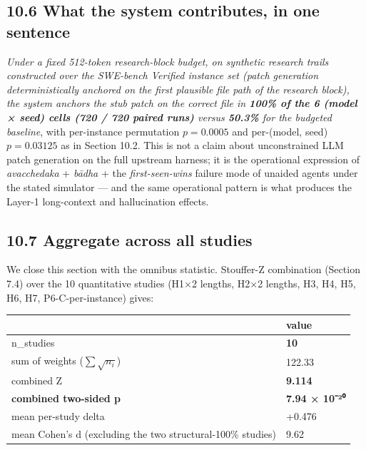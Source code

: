 \subsection{10.6 What the system contributes, in one sentence}\label{what-the-system-contributes-in-one-sentence}

\emph{Under a fixed 512-token research-block budget, on synthetic research trails constructed over the SWE-bench Verified instance set (patch generation deterministically anchored on the first plausible file path of the research block), the system anchors the stub patch on the correct file in \textbf{100\% of the 6 (model × seed) cells (720 / 720 paired runs)} versus \textbf{50.3\%} for the budgeted baseline}, with per-instance permutation \(p = 0.0005\) and per-(model, seed) \(p = 0.03125\) as in Section 10.2. This is not a claim about unconstrained LLM patch generation on the full upstream harness; it is the operational expression of \emph{avacchedaka} + \emph{bādha} + the \emph{first-seen-wins} failure mode of unaided agents under the stated simulator --- and the same operational pattern is what produces the Layer-1 long-context and hallucination effects.

\subsection{10.7 Aggregate across all studies}\label{aggregate-across-all-studies}

We close this section with the omnibus statistic. Stouffer-Z combination (Section 7.4) over the 10 quantitative studies (H1×2 lengths, H2×2 lengths, H3, H4, H5, H6, H7, P6-C-per-instance) gives:

{\def\LTcaptype{none} %
\begin{longtable}[]{@{}ll@{}}
\toprule\noalign{}
& value \\
\midrule\noalign{}
\endhead
\bottomrule\noalign{}
\endlastfoot
n\_studies & \textbf{10} \\
sum of weights (\(\sum \sqrt{n_i}\)) & 122.33 \\
combined Z & \textbf{9.114} \\
\textbf{combined two-sided p} & \textbf{7.94 × 10⁻²⁰} \\
mean per-study delta & +0.476 \\
mean Cohen's d (excluding the two structural-100\% studies) & 9.62 \\
\end{longtable}
}

